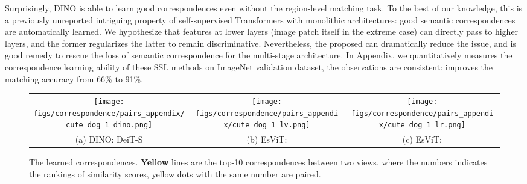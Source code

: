 \documentclass{article} \usepackage{iclr2022_conference,times}
\newcommand{\shortname}{EsViT}
\begin{document}
Surprisingly, DINO is able to learn good correspondences even without the region-level matching task. To the best of our knowledge, this is a previously unreported intriguing property of self-supervised Transformers with monolithic architectures: good semantic correspondences are automatically learned. We hypothesize that features at lower layers (image patch itself in the extreme case) can directly pass to higher layers, and the former regularizes the latter to remain discriminative. Nevertheless, the proposed  can dramatically reduce the issue, and is good remedy to rescue the loss of semantic correspondence for the multi-stage architecture. 
In Appendix, we quantitatively measures the correspondence learning ability of these SSL methods on ImageNet validation dataset, the observations are consistent:  improves the matching accuracy from 66\% to 91\%.


\begin{figure*}[t!]\vspace{-0mm}\centering
	\begin{tabular}{c c c}
		\hspace{-2mm}
		\texttt{[image: figs/correspondence/pairs\_appendix/cute\_dog\_1\_dino.png]}  & 
\hspace{-3mm}
		\texttt{[image: figs/correspondence/pairs\_appendix/cute\_dog\_1\_lv.png]} & 
		\hspace{-3mm}
		\texttt{[image: figs/correspondence/pairs\_appendix/cute\_dog\_1\_lr.png]} 		
		\\
		(a) DINO: DeiT-S  & 
		\hspace{-2mm}
		(b) \shortname{}:     \vspace{2mm} & 
		\hspace{-2mm}		
		(c) \shortname{}:    \hspace{-0mm} \\ 
	\end{tabular}
	\vspace{-3mm}
	\caption{The learned correspondences.  {\bf \textcolor{yellow!80!black}{Yellow}}  lines are the top-10 correspondences between two views, where the numbers indicates the rankings of similarity scores, yellow dots with the same number are paired.
	 }
	\vspace{-3mm}
	\label{fig:correspondences}
\end{figure*}
\end{document}
